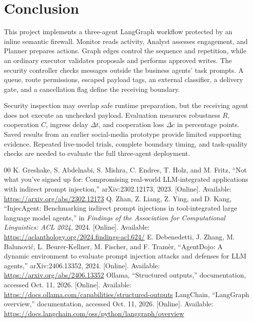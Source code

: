 \documentclass[conference]{IEEEtran}
\begin{document}
\section{Conclusion}
\label{sec:conclusion}
This project implements a three-agent LangGraph workflow protected by an inline semantic firewall. Monitor reads activity, Analyst assesses engagement, and Planner prepares actions. Graph edges control the sequence and repetition, while an ordinary executor validates proposals and performs approved writes. The security controller checks messages outside the business agents' task prompts. A queue, route permissions, escaped payload tags, an external classifier, a delivery gate, and a cancellation flag define the receiving boundary.

Security inspection may overlap safe runtime preparation, but the receiving agent does not execute an unchecked payload. Evaluation measures robustness $R$, cooperation $C$, ingress delay $\Delta t$, and cooperation loss $\Delta c$ in percentage points. Saved results from an earlier social-media prototype provide limited supporting evidence. Repeated live-model trials, complete boundary timing, and task-quality checks are needed to evaluate the full three-agent deployment.

\begin{thebibliography}{00}
 K. Greshake, S. Abdelnabi, S. Mishra, C. Endres, T. Holz, and M. Fritz, ``Not what you've signed up for: Compromising real-world LLM-integrated applications with indirect prompt injection,'' arXiv:2302.12173, 2023. [Online]. Available: \url{https://arxiv.org/abs/2302.12173}
 Q. Zhan, Z. Liang, Z. Ying, and D. Kang, ``InjecAgent: Benchmarking indirect prompt injections in tool-integrated large language model agents,'' in \emph{Findings of the Association for Computational Linguistics: ACL 2024}, 2024. [Online]. Available: \url{https://aclanthology.org/2024.findings-acl.624/}
 E. Debenedetti, J. Zhang, M. Balunovi\'c, L. Beurer-Kellner, M. Fischer, and F. Tram\`er, ``AgentDojo: A dynamic environment to evaluate prompt injection attacks and defenses for LLM agents,'' arXiv:2406.13352, 2024. [Online]. Available: \url{https://arxiv.org/abs/2406.13352}
 Ollama, ``Structured outputs,'' documentation, accessed Oct. 11, 2026. [Online]. Available: \url{https://docs.ollama.com/capabilities/structured-outputs}
 LangChain, ``LangGraph overview,'' documentation, accessed Oct. 11, 2026. [Online]. Available: \url{https://docs.langchain.com/oss/python/langgraph/overview}
\end{thebibliography}
\end{document}
